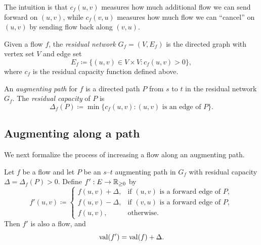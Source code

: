 \documentclass[11pt]{article}
\begin{document}
The intuition is that $c_f(u,v)$ measures how much additional flow we can send
forward on $(u,v)$, while $c_f(v,u)$ measures how much flow we can ``cancel''
on $(u,v)$ by sending flow back along $(v,u)$.

\begin{definition}
Given a flow $f$, the \emph{residual network} $G_f=(V,E_f)$ is the directed
graph with vertex set $V$ and edge set
\[
  E_f \coloneqq \{(u,v)\in V\times V : c_f(u,v) > 0\},
\]
where $c_f$ is the residual capacity function defined above.
\end{definition}

\begin{definition}
An \emph{augmenting path} for $f$ is a directed path $P$ from $s$ to $t$ in the
residual network $G_f$. The \emph{residual capacity} of $P$ is
\[
  \Delta_f(P) \coloneqq \min\{ c_f(u,v) : (u,v)\text{ is an edge of }P\}.
\]
\end{definition}

\subsection{Augmenting along a path}

We next formalize the process of increasing a flow along an augmenting path.

\begin{lemma}\label{lem:augment}
Let $f$ be a flow and let $P$ be an $s$--$t$ augmenting path in $G_f$ with
residual capacity $\Delta = \Delta_f(P) > 0$. Define $f':E\to \mathbb{R}_{\ge 0}$ by
\[
  f'(u,v) \coloneqq
  \begin{cases}
    f(u,v) + \Delta, & \text{if }(u,v)\text{ is a forward edge of }P,\\[0.25em]
    f(u,v) - \Delta, & \text{if }(v,u)\text{ is a forward edge of }P,\\[0.25em]
    f(u,v), & \text{otherwise}.
  \end{cases}
\]
Then $f'$ is also a flow, and
\[
  \mathrm{val}(f') = \mathrm{val}(f) + \Delta.
\]
\end{lemma}
\end{document}
